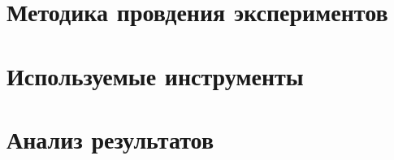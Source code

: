 \section{Методика провдения экспериментов}

\section{Используемые инструменты}

\section{Анализ результатов}
